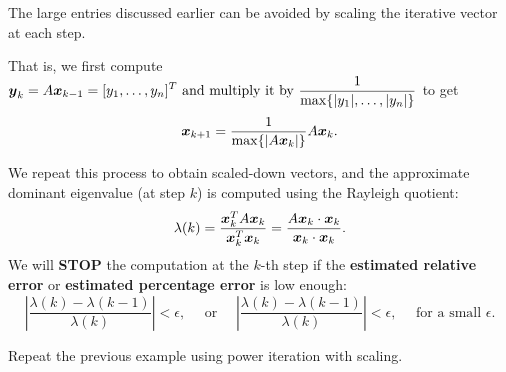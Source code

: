 \begin{theorem}
The large entries discussed earlier can be avoided by scaling the iterative vector at each step. 

\smallskip
\noindent
That is, we first compute
\(\displaystyle
\boldsymbol{y}_{k} = A\boldsymbol{x}_{k-1} = [y_1, \dots, y_n]^T \text{ and multiply it by }
\frac1{ \max \{|y_{1}|,\dots,|y_{n}|\}}\) to get
\[
    \boldsymbol{x}_{k+1} = \frac1{\max\{|A\boldsymbol{x}_k|\}}A\boldsymbol{x}_{k}.
\]
\end{theorem}
We repeat this process to obtain scaled-down vectors, and the approximate dominant eigenvalue (at step $k$) is computed using the Rayleigh quotient:
\[
\lambda (k) = \frac{\boldsymbol{x}_k^T A \boldsymbol{x}_k}{\boldsymbol{x}_k^T \boldsymbol{x}_k} = \frac{A\boldsymbol{x}_k \cdot \boldsymbol{x}_k}{\boldsymbol{x}_k \cdot \boldsymbol{x}_k}.
\]
We will \textbf{STOP} the computation at the $k$-th step if the \textbf{estimated relative error} or \textbf{estimated percentage error} is low enough:
\[
\left| \frac{\lambda(k)-\lambda(k-1)}{\lambda(k)} \right| < \epsilon, \quad
\text{ or } \quad \left| \frac{\lambda(k)-\lambda(k-1)}{\lambda(k)} \right| < \epsilon, \quad
\text{ for a small } \epsilon.
\]

\begin{example}
Repeat the previous example using power iteration with scaling.
\end{example}

